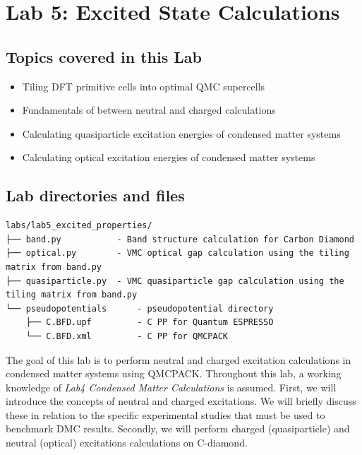 \chapter{Lab 5: Excited State Calculations}
\label{chap:excited}


\section{Topics covered in this Lab}
\begin{itemize}
	\item{Tiling DFT primitive cells into optimal QMC supercells}
	\item{Fundamentals of  between neutral and charged calculations}
	\item{Calculating quasiparticle excitation energies of condensed matter systems}
	\item{Calculating optical excitation energies of condensed matter systems}
\end{itemize}

\section{Lab directories and files}

\begin{verbatim}
labs/lab5_excited_properties/
├── band.py           - Band structure calculation for Carbon Diamond
├── optical.py        - VMC optical gap calculation using the tiling matrix from band.py
├── quasiparticle.py  - VMC quasiparticle gap calculation using the tiling matrix from band.py
└── pseudopotentials      - pseudopotential directory
    ├── C.BFD.upf         - C PP for Quantum ESPRESSO
    └── C.BFD.xml         - C PP for QMCPACK
\end{verbatim}

The goal of this lab is to perform neutral and charged excitation calculations in condensed matter systems using QMCPACK. 
Throughout this lab, a working knowledge of \textit{Lab4 Condensed Matter Calculations} is assumed. 
First, we will introduce the concepts of neutral and charged excitations. 
We will briefly discuss these in relation to the specific experimental studies that must be used to benchmark DMC results. 
Secondly, we will perform charged (quasiparticle) and neutral (optical) excitations calculations on C-diamond.

